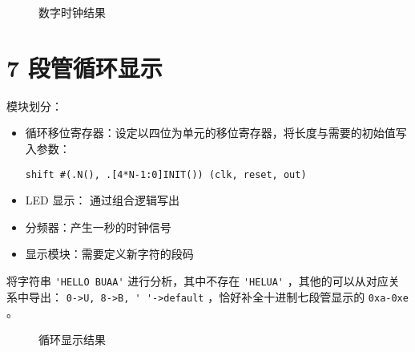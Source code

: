 \documentclass[lang=cn,11pt,a4paper,cite=authoryear]{elegantpaper}
\begin{document}
\begin{figure}
    \centering
    \caption{数字时钟结果}\label{04} 
     \hfill 
     \hfill
     \hfill 
     \bigskip 
\end{figure}

\section{7 段管循环显示}

模块划分：

\begin{itemize}
    \item 循环移位寄存器：设定以四位为单元的移位寄存器，将长度与需要的初始值写入参数：

    \lstinline{shift #(.N(), .[4*N-1:0]INIT()) (clk, reset, out)} 
    \item LED 显示： 通过组合逻辑写出
    \item 分频器：产生一秒的时钟信号
    \item 显示模块：需要定义新字符的段码
\end{itemize}

将字符串 \lstinline{'HELLO BUAA'} 进行分析，其中不存在 \lstinline{'HELUA'} ，其他的可以从对应关系中导出： \lstinline{0->U, 8->B, ' '->default} ，恰好补全十进制七段管显示的 \lstinline{0xa-0xe} 。

\begin{figure}
    \centering
    \caption{循环显示结果}\label{05} 
     \hfill 
     \hfill 
     \hfill 
    
    \bigskip

     \hfill 
     \hfill 
     \hfill 
     \bigskip  
     \hfill 
     \hfill 
     \hfill 
\end{figure}
\end{document}
